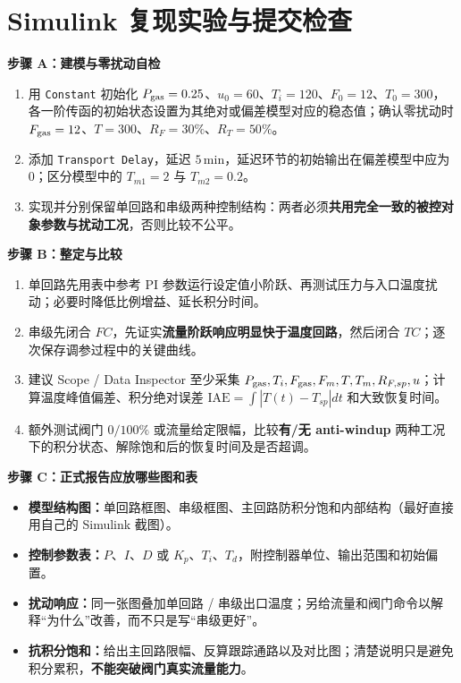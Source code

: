 \documentclass[UTF8,a4paper,11pt]{ctexart}
\newcommand{\task}[1]{\par\noindent\textcolor{accent}{\textbf{#1}}\par}
\newcommand{\unit}[1]{\,\mathrm{#1}}
\begin{document}
\section{Simulink 复现实验与提交检查}
\task{步骤 A：建模与零扰动自检}
\begin{enumerate}
\item 用 \texttt{Constant} 初始化 $P_{\rm gas}=0.25$、$u_0=60$、$T_i=120$、$F_0=12$、$T_0=300$，各一阶传函的初始状态设置为其绝对或偏差模型对应的稳态值；确认零扰动时 $F_{\rm gas}=12$、$T=300$、$R_F=30\%$、$R_T=50\%$。
\item 添加 \texttt{Transport Delay}，延迟 $5\unit{min}$，延迟环节的初始输出在偏差模型中应为 $0$；区分模型中的 $T_{m1}=2$ 与 $T_{m2}=0.2$。
\item 实现并分别保留单回路和串级两种控制结构：两者必须\textbf{共用完全一致的被控对象参数与扰动工况}，否则比较不公平。
\end{enumerate}
\task{步骤 B：整定与比较}
\begin{enumerate}
\item 单回路先用表中参考 PI 参数运行设定值小阶跃、再测试压力与入口温度扰动；必要时降低比例增益、延长积分时间。
\item 串级先闭合 $FC$，先证实\textbf{流量阶跃响应明显快于温度回路}，然后闭合 $TC$；逐次保存调参过程中的关键曲线。
\item 建议 Scope / Data Inspector 至少采集 $P_{\rm gas},T_i,F_{\rm gas},F_m,T,T_m,R_{F,sp},u$；计算温度峰值偏差、积分绝对误差 $\mathrm{IAE}=\int|T(t)-T_{sp}|dt$ 和大致恢复时间。
\item 额外测试阀门 $0/100\%$ 或流量给定限幅，比较\textbf{有/无 anti-windup} 两种工况下的积分状态、解除饱和后的恢复时间及是否超调。
\end{enumerate}
\task{步骤 C：正式报告应放哪些图和表}
\begin{itemize}
\item \textbf{模型结构图：}单回路框图、串级框图、主回路防积分饱和内部结构（最好直接用自己的 Simulink 截图）。
\item \textbf{控制参数表：}$P$、$I$、$D$ 或 $K_p$、$T_i$、$T_d$，附控制器单位、输出范围和初始偏置。
\item \textbf{扰动响应：}同一张图叠加单回路 / 串级出口温度；另给流量和阀门命令以解释“为什么”改善，而不只是写“串级更好”。
\item \textbf{抗积分饱和：}给出主回路限幅、反算跟踪通路以及对比图；清楚说明只是避免积分累积，\textbf{不能突破阀门真实流量能力}。
\end{itemize}
\end{document}
